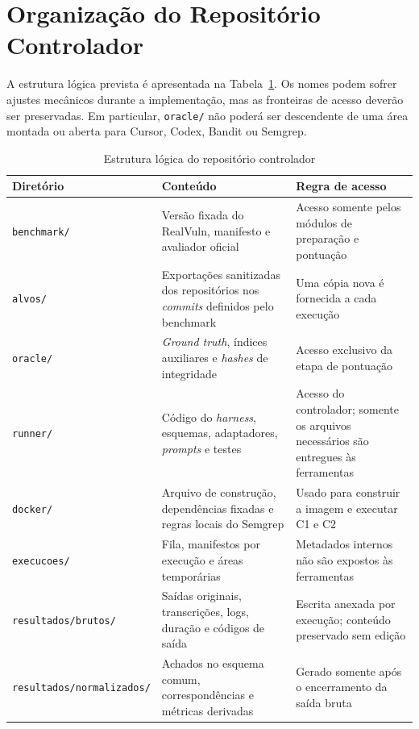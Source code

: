 \section{Organização do Repositório Controlador}\label{sec:organizacao-repositorio-desenvolvimento}

A estrutura lógica prevista é apresentada na Tabela~\ref{tab:estrutura-repositorio-experimental}. Os nomes podem sofrer ajustes mecânicos durante a implementação, mas as fronteiras de acesso deverão ser preservadas. Em particular, \texttt{oracle/} não poderá ser descendente de uma área montada ou aberta para Cursor, Codex, Bandit ou Semgrep.

\begin{table}[htb]
\ABNTEXfontereduzida
\caption{\label{tab:estrutura-repositorio-experimental}Estrutura lógica do repositório controlador}
\centering
\begin{tabularx}{\textwidth}{|l|X|X|}
\hline
\textbf{Diretório} & \textbf{Conteúdo} & \textbf{Regra de acesso} \\
\hline
\texttt{benchmark/} & Versão fixada do RealVuln, manifesto e avaliador oficial & Acesso somente pelos módulos de preparação e pontuação \\
\hline
\texttt{alvos/} & Exportações sanitizadas dos repositórios nos \textit{commits} definidos pelo benchmark & Uma cópia nova é fornecida a cada execução \\
\hline
\texttt{oracle/} & \textit{Ground truth}, índices auxiliares e \textit{hashes} de integridade & Acesso exclusivo da etapa de pontuação \\
\hline
\texttt{runner/} & Código do \textit{harness}, esquemas, adaptadores, \textit{prompts} e testes & Acesso do controlador; somente os arquivos necessários são entregues às ferramentas \\
\hline
\texttt{docker/} & Arquivo de construção, dependências fixadas e regras locais do Semgrep & Usado para construir a imagem e executar C1 e C2 \\
\hline
\texttt{execucoes/} & Fila, manifestos por execução e áreas temporárias & Metadados internos não são expostos às ferramentas \\
\hline
\texttt{resultados/brutos/} & Saídas originais, transcrições, logs, duração e códigos de saída & Escrita anexada por execução; conteúdo preservado sem edição \\
\hline
\texttt{resultados/normalizados/} & Achados no esquema comum, correspondências e métricas derivadas & Gerado somente após o encerramento da saída bruta \\
\hline
\end{tabularx}
\end{table}

